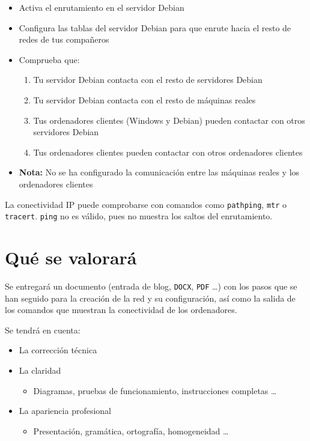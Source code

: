\begin{itemize}
\item Activa el enrutamiento en el servidor Debian
\item Configura las tablas del servidor Debian para que enrute hacia el resto de redes de tus compañeros
\item Comprueba que:
  \begin{enumerate}
  \item Tu servidor Debian contacta con el resto de servidores Debian
  \item Tu servidor Debian contacta con el resto de máquinas reales
  \item Tus ordenadores clientes (Windows y Debian) pueden contactar con otros servidores Debian
  \item Tus ordenadores clientes pueden contactar con otros ordenadores clientes
  \end{enumerate}
\item \textbf{Nota:} No se ha configurado la comunicación entre las máquinas reales y los ordenadores clientes
\end{itemize}

La conectividad IP puede comprobarse con comandos como \texttt{pathping}, \texttt{mtr} o \texttt{tracert}. \texttt{ping} no es válido, pues no muestra los saltos del enrutamiento.

\section{Qué se valorará}
Se entregará un documento (entrada de blog, \texttt{DOCX}, \texttt{PDF} \ldots) con los pasos que se han seguido para la creación de la red y su configuración, así como la salida de los comandos que muestran la conectividad de los ordenadores.

Se tendrá en cuenta:
\begin{itemize}
\item La corrección técnica
\item La claridad
  \begin{itemize}
  \item Diagramas, pruebas de funcionamiento, instrucciones completas \ldots
  \end{itemize}
\item La apariencia profesional
  \begin{itemize}
  \item Presentación, gramática, ortografía, homogeneidad \ldots
  \end{itemize}

\end{itemize}


